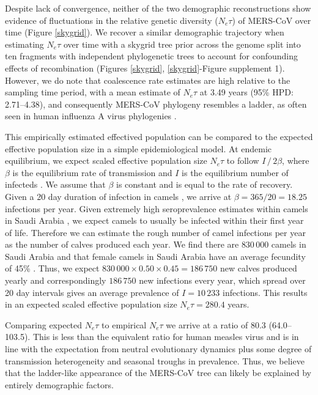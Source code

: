 \documentclass[9pt,lineno]{elife}
\begin{document}
Despite lack of convergence, neither of the two demographic reconstructions show evidence of fluctuations in the relative genetic diversity ($N_e \tau$) of  MERS-CoV over time (Figure \ref{skygrid}).
We recover a similar demographic trajectory when estimating $N_{e}\tau$ over time with a skygrid tree prior across the genome split into ten fragments with independent phylogenetic trees to account for confounding effects of recombination (Figures \ref{skygrid}, \ref{skygrid}-Figure supplement 1).
However, we do note that coalescence rate estimates are high relative to the sampling time period, with a mean estimate of $N_e\tau$ at 3.49 years (95\% HPD: 2.71--4.38), and consequently MERS-CoV phylogeny resembles a ladder, as often seen in human influenza A virus phylogenies \citep{bedford_strength_2011}.

This empirically estimated effectived population can be compared to the expected effective population size in a simple epidemiological model.
At endemic equilibrium, we expect scaled effective population size $N_{e}\tau$ to follow $I \, / \, 2 \beta$, where $\beta$ is the equilibrium rate of transmission and $I$ is the equilibrium number of infecteds \citep{frost_viral_2010}.
We assume that $\beta$ is constant and is equal to the rate of recovery.
Given a 20 day duration of infection in camels \citep{adney_replication_2014}, we arrive at $\beta = 365/20 = 18.25$ infections per year.
Given extremely high seroprevalence estimates within camels in Saudi Arabia \citep{muller_2014,corman_antibodies_2014,chu_2014,reusken_2013,reusken_2014}, we expect camels to usually be infected within their first year of life.
Therefore we can estimate the rough number of camel infections per year as the number of calves produced each year.
We find there are $830\,000$ camels in Saudi Arabia \citep{abdallah_camel_farming_2013} and that female camels in Saudi Arabia have an average fecundity of 45\% \citep{abdallah_camel_farming_2013}.
Thus, we expect $830\,000 \times 0.50 \times 0.45 = 186\,750$ new calves produced yearly and correspondingly $186\,750$ new infections every year, which spread over 20 day intervals gives an average prevalence of $I = 10\,233$ infections.
This results in an expected scaled effective population size $N_{e}\tau=280.4$ years.

Comparing expected $N_{e}\tau$ to empirical $N_{e}\tau$ we arrive at a ratio of 80.3 (64.0--103.5).
This is less than the equivalent ratio for human measles virus \citep{bedford_strength_2011} and is in line with the expectation from neutral evolutionary dynamics plus some degree of transmission heterogeneity \citep{volz_phylodynamics_2013} and seasonal troughs in prevalence.
Thus, we believe that the ladder-like appearance of the MERS-CoV tree can likely be explained by entirely demographic factors.
\end{document}
